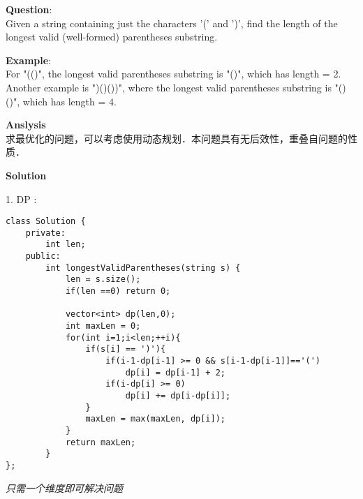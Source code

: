     
\begin{description}
    \item{\textbf{Question}}:\\%
		Given a string containing just the characters '(' and ')', find the length of the longest valid (well-formed) parentheses substring.\\

    \item{\textbf{Example}}:\\
		For "(()", the longest valid parentheses substring is "()", which has length = 2.\\
		Another example is ")()())", where the longest valid parentheses substring is "()()", which has length = 4.\\

    \item{\textbf{Anslysis}}\\
		求最优化的问题，可以考虑使用动态规划．本问题具有无后效性，重叠自问题的性质．\\

    \item{\textbf{Solution}}\\
	\item{1. DP} : \\
    \begin{lstlisting}
class Solution {
	private:
		int len;
	public:
		int longestValidParentheses(string s) {
			len = s.size();
			if(len ==0)	return 0;

			vector<int> dp(len,0);
			int maxLen = 0;
			for(int i=1;i<len;++i){
				if(s[i] == ')'){
					if(i-1-dp[i-1] >= 0 && s[i-1-dp[i-1]]=='(')
						dp[i] = dp[i-1] + 2;
					if(i-dp[i] >= 0)
						dp[i] += dp[i-dp[i]];
				}
				maxLen = max(maxLen, dp[i]); 
			}
			return maxLen;
		}
};    \end{lstlisting}
	\textit{只需一个维度即可解决问题}
\end{description}

